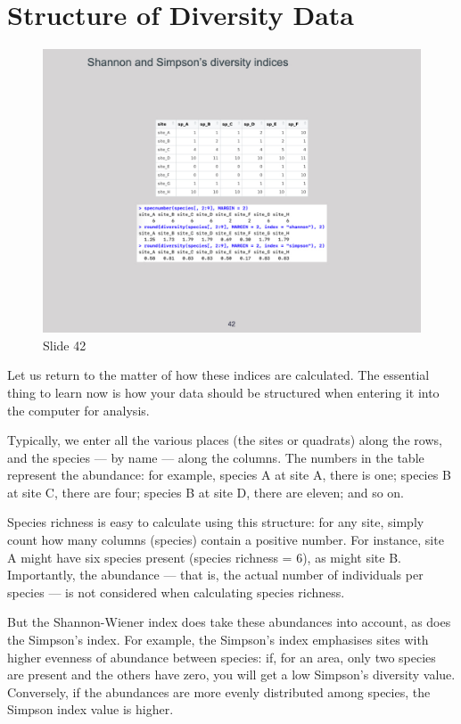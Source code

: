 \documentclass[
  12pt,
]{book}
\begin{document}
\section{Structure of Diversity Data}\label{structure-of-diversity-data}

\begin{figure}[ht]
\centering
\includegraphics[width=0.8\linewidth]{../images/BDC334/BDC334-042.jpeg}
\caption*{Slide 42}
\end{figure}

Let us return to the matter of how these indices are calculated. The
essential thing to learn now is how your data should be structured when
entering it into the computer for analysis.

Typically, we enter all the various places (the sites or quadrats) along
the rows, and the species --- by name --- along the columns. The numbers
in the table represent the abundance: for example, species A at site A,
there is one; species B at site C, there are four; species B at site D,
there are eleven; and so on.

Species richness is easy to calculate using this structure: for any
site, simply count how many columns (species) contain a positive number.
For instance, site A might have six species present (species richness =
\(6\)), as might site B. Importantly, the abundance --- that is, the
actual number of individuals per species --- is not considered when
calculating species richness.

But the Shannon-Wiener index does take these abundances into account, as
does the Simpson's index. For example, the Simpson's index emphasises
sites with higher evenness of abundance between species: if, for an
area, only two species are present and the others have zero, you will
get a low Simpson's diversity value. Conversely, if the abundances are
more evenly distributed among species, the Simpson index value is
higher.
\end{document}
